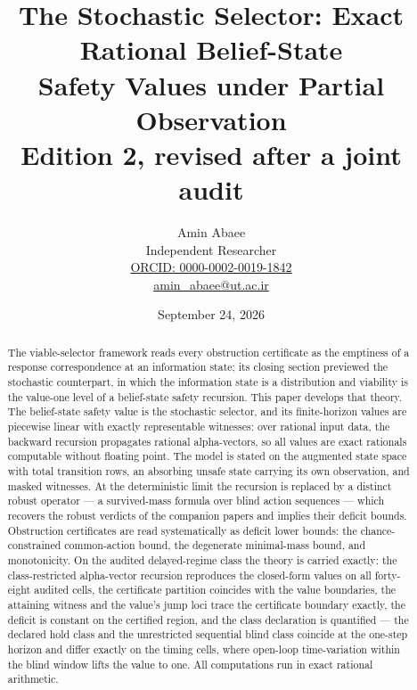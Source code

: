 \documentclass[10pt,twocolumn]{article}
\theoremstyle{definition}
\begin{document}
\title{The Stochastic Selector: Exact Rational Belief-State\\ Safety Values under Partial Observation\\[0.2em]
{\large\rmfamily Edition 2, revised after a joint audit}}
\author{Amin Abaee\\[0.35em]
{\small Independent Researcher}\\[0.55em]
{\small\href{https://orcid.org/0000-0002-0019-1842}{ORCID: 0000-0002-0019-1842}}\\[0.3em]
{\small\href{mailto:amin\_abaee@ut.ac.ir}{amin\_abaee@ut.ac.ir}}}
\date{September 24, 2026}
\maketitle

\begin{abstract}

The viable-selector framework reads every obstruction certificate as the
emptiness of a response correspondence at an information state; its closing
section previewed the stochastic counterpart, in which the information state
is a distribution and viability is the value-one level of a belief-state
safety recursion. This paper develops that theory. The belief-state safety
value is the stochastic selector, and its finite-horizon values are
piecewise linear with exactly representable witnesses: over rational input
data, the backward recursion propagates rational alpha-vectors, so all
values are exact rationals computable without floating point. The model is
stated on the augmented state space with total transition rows, an
absorbing unsafe state carrying its own observation, and masked witnesses.
At the deterministic limit the recursion is replaced by a distinct robust
operator --- a survived-mass formula over blind action sequences --- which
recovers the robust verdicts of the companion papers and implies their
deficit bounds. Obstruction certificates are read systematically as deficit
lower bounds: the chance-constrained common-action bound, the degenerate
minimal-mass bound, and monotonicity. On the audited delayed-regime class
the theory is carried exactly: the class-restricted alpha-vector recursion
reproduces the closed-form values on all forty-eight audited cells, the
certificate partition coincides with the value boundaries, the attaining
witness and the value's jump loci trace the certificate boundary exactly,
the deficit is constant on the certified region, and the class declaration
is quantified --- the declared hold class and the unrestricted sequential
blind class coincide at the one-step horizon and differ exactly on the
timing cells, where open-loop time-variation within the blind window lifts
the value to one. All computations run in exact rational arithmetic.

\end{abstract}
\end{document}
